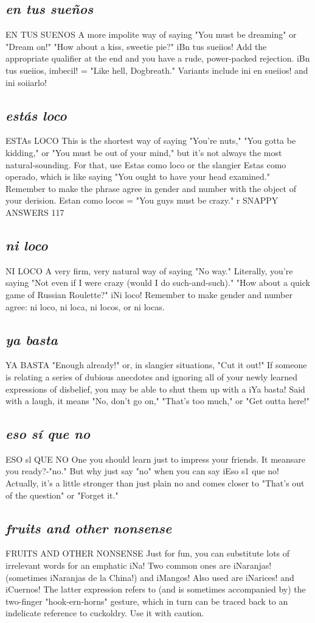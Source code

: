 \documentclass[14pt,a4paper,oneside]{memoir}
\begin{document}
\subsection{\emph{en tus sueños}}
EN TUS SUENOS
A more impolite way of saying "You must be dreaming" or
"Dream on!" "How about a kiss, sweetie pie?" iBn tus sueiios! Add the
appropriate qualifier at the end and you have a rude, power-packed rejection. iBn tus sueiios, imbecil! = "Like hell, Dogbreath." Variants
include ini en sueiios! and ini soiiarlo!
\subsection{\emph{estás loco}}
ESTAs LOCO
This is the shortest way of saying "You're nuts," "You gotta be
kidding," or "You must be out of your mind," but it's not always the
most natural-sounding. For that, use Estas como loco or the slangier
Estas como operado, which is like saying "You ought to have your
head examined." Remember to make the phrase agree in gender and
number with the object of your derision. Estan como locos = "You
guys must be crazy."
r SNAPPY ANSWERS 117
\subsection{\emph{ni loco}}
NI LOCO
A very firm, very natural way of saying "No way." Literally,
you're saying "Not even if I were crazy (would I do such-and-such)."
"How about a quick game of Russian Roulette?" iNi loco! Remember to make gender and number agree: ni loco, ni loca, ni locos, or
ni locas.
\subsection{\emph{ya basta}}
YA BASTA
"Enough already!" or, in slangier situations, "Cut it out!" If
someone is relating a series of dubious anecdotes and ignoring all of
your newly learned expressions of disbelief, you may be able to shut
them up with a iYa basta! Said with a laugh, it means "No, don't go
on," "That's too much," or "Get outta here!"
\subsection{\emph{eso sí que no}}
ESO sl QUE NO
One you should learn just to impress your friends. It meansare you ready?-"no." But why just say "no" when you can say iEso s1
que no! Actually, it's a little stronger than just plain no and comes
closer to "That's out of the question" or "Forget it."
\subsection{\emph{fruits and other nonsense}}
FRUITS AND OTHER NONSENSE
Just for fun, you can substitute lots of irrelevant words for an
emphatic iNa! Two common ones are iNaranjas! (sometimes iNaranjas de la China!) and iMangos! Also used are iNarices! and iCuernos!
The latter expression refers to (and is sometimes accompanied by) the
two-finger "hook-ern-horns" gesture, which in turn can be traced back
to an indelicate reference to cuckoldry. Use it with caution.
\end{document}

